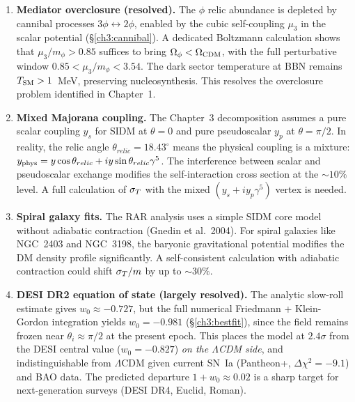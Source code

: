 \begin{enumerate}
\item \textbf{Mediator overclosure (resolved).}
      The $\phi$ relic abundance is depleted by cannibal processes
      $3\phi \leftrightarrow 2\phi$, enabled by the cubic self-coupling $\mu_3$
      in the scalar potential (§\ref{ch3:cannibal}). A dedicated Boltzmann
      calculation shows that $\mu_3/m_\phi > 0.85$ suffices to bring
      $\Omega_\phi < \Omega_{\rm CDM}$, with the full perturbative window
      $0.85 < \mu_3/m_\phi < 3.54$. The dark sector temperature at BBN
      remains $T_{\rm SM} > 1$~MeV, preserving nucleosynthesis.
      This resolves the overclosure problem identified in Chapter~1.

\item \textbf{Mixed Majorana coupling.}
      The Chapter~3 decomposition assumes a pure scalar coupling $y_s$ for
      SIDM at $\theta = 0$ and pure pseudoscalar $y_p$ at $\theta = \pi/2$.
      In reality, the relic angle $\theta_{relic} = 18.43^\circ$ means the
      physical coupling is a mixture:
      $y_{\rm phys} = y\cos\theta_{relic} + iy\sin\theta_{relic}\gamma^5$.
      The interference between scalar and pseudoscalar exchange modifies
      the self-interaction cross section at the $\sim 10\%$ level. A full
      calculation of $\sigma_T$ with the mixed $(y_s + iy_p\gamma^5)$ vertex
      is needed.

\item \textbf{Spiral galaxy fits.}
      The RAR analysis uses a simple SIDM core model without adiabatic
      contraction (Gnedin et al.~2004). For spiral galaxies like NGC~2403
      and NGC~3198, the baryonic gravitational potential modifies the DM
      density profile significantly. A self-consistent calculation with
      adiabatic contraction could shift $\sigma_T/m$ by up to $\sim 30\%$.

\item \textbf{DESI DR2 equation of state (largely resolved).}
      The analytic slow-roll estimate gives $w_0 \approx -0.727$, but the
      full numerical Friedmann + Klein-Gordon integration yields
      $w_0 = -0.981$ (§\ref{ch3:bestfit}), since the field remains frozen
      near $\theta_i \approx \pi/2$ at the present epoch. This places the
      model at $2.4\sigma$ from the DESI central value ($w_0 = -0.827$)
      \emph{on the $\Lambda$CDM side}, and indistinguishable from $\Lambda$CDM
      given current SN~Ia (Pantheon+, $\Delta\chi^2 = -9.1$) and BAO data.
      The predicted departure $1 + w_0 \approx 0.02$ is a sharp target for
      next-generation surveys (DESI DR4, Euclid, Roman).


\end{enumerate}
